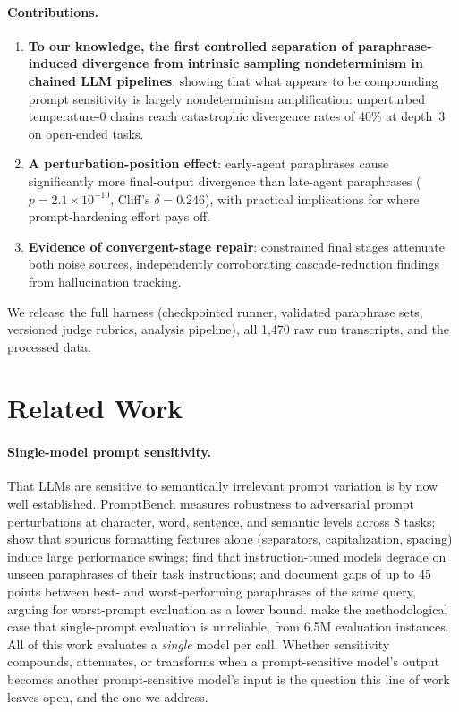 \documentclass[11pt]{article}
\begin{document}
\paragraph{Contributions.}
\begin{enumerate}
  \item \textbf{To our knowledge, the first controlled separation of
  paraphrase-induced divergence from intrinsic sampling nondeterminism in
  chained LLM pipelines}, showing that what appears to be compounding prompt
  sensitivity is largely nondeterminism amplification: unperturbed
  temperature-0 chains reach catastrophic divergence rates of 40\% at
  depth~3 on open-ended tasks.
  \item \textbf{A perturbation-position effect}: early-agent paraphrases
  cause significantly more final-output divergence than late-agent
  paraphrases ($p = 2.1\times10^{-10}$, Cliff's $\delta = 0.246$), with
  practical implications for where prompt-hardening effort pays off.
  \item \textbf{Evidence of convergent-stage repair}: constrained final
  stages attenuate both noise sources, independently corroborating
  cascade-reduction findings from hallucination tracking.
\end{enumerate}

We release the full harness (checkpointed runner, validated paraphrase sets,
versioned judge rubrics, analysis pipeline), all 1{,}470 raw run
transcripts, and the processed data.

\section{Related Work}

\paragraph{Single-model prompt sensitivity.} That LLMs are sensitive to
semantically irrelevant prompt variation is by now well established.
PromptBench \citep{zhu2023} measures robustness to adversarial prompt
perturbations at character, word, sentence, and semantic levels across 8
tasks; \citet{sclar2024} show that spurious formatting features
alone (separators, capitalization, spacing) induce large performance
swings; \citet{sun2023} find that instruction-tuned models degrade on unseen
paraphrases of their task instructions; and \citet{cao2024} document gaps of
up to 45 points between best- and worst-performing paraphrases of the same
query, arguing for worst-prompt evaluation as a lower bound.
\citet{mizrahi2024} make the methodological case that single-prompt
evaluation is unreliable, from 6.5M evaluation instances. All of this work
evaluates a \emph{single} model per call. Whether sensitivity compounds,
attenuates, or transforms when a prompt-sensitive model's output becomes
another prompt-sensitive model's input is the question this line of work
leaves open, and the one we address.
\end{document}
